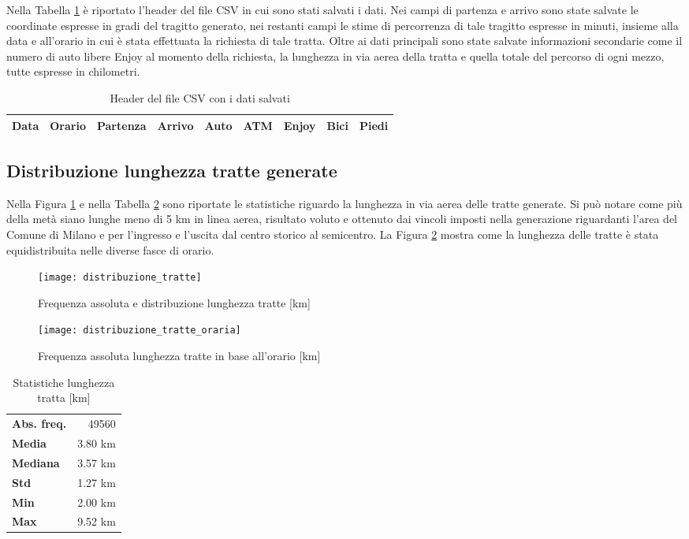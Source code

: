 Nella Tabella \ref{table:7} è riportato l'header del file CSV in cui sono stati salvati i dati. Nei campi di partenza e arrivo sono state salvate le coordinate espresse in gradi del tragitto generato, nei restanti campi le stime di percorrenza di tale tragitto espresse in minuti, insieme alla data e all'orario in cui è stata effettuata la richiesta di tale tratta. Oltre ai dati principali sono state salvate informazioni secondarie come il numero di auto libere Enjoy al momento della richiesta, la lunghezza in via aerea della tratta e quella totale del percorso di ogni mezzo, tutte espresse in chilometri.

\begin{table}[H]
	\centering
	\begin{tabular}{ | c | c | c | c | c | c | c | c | c | }
		\hline
		Data & Orario & Partenza & Arrivo & Auto & ATM & Enjoy & Bici & Piedi \\
		\hline
	\end{tabular}
	\caption{Header del file CSV con i dati salvati}
	\label{table:7}
\end{table}

\subsection{Distribuzione lunghezza tratte generate}

Nella Figura \ref{image:2} e nella Tabella \ref{table:2} sono riportate le statistiche riguardo la lunghezza in via aerea delle tratte generate. Si può notare come più della metà siano lunghe meno di 5 km in linea aerea, risultato voluto e ottenuto dai vincoli imposti nella generazione riguardanti l'area del Comune di Milano e per l'ingresso e l'uscita dal centro storico al semicentro. La Figura \ref{image:19} mostra come la lunghezza delle tratte è stata equidistribuita nelle diverse fasce di orario.

\begin{figure}[H]
	\centering
	\texttt{[image: distribuzione\_tratte]}
	\caption{Frequenza assoluta e distribuzione lunghezza tratte [km]}
	\label{image:2}
\end{figure}

\begin{figure}[H]
	\centering
	\texttt{[image: distribuzione\_tratte\_oraria]}
	\caption{Frequenza assoluta lunghezza tratte in base all'orario [km]}
	\label{image:19}
\end{figure}

\begin{table}[H]
	\centering
	\begin{tabular}{ | l r | }
		\hline
		\textbf{Abs. freq.} & 49560 \\
		\textbf{Media} & 3.80 km \\
		\textbf{Mediana} & 3.57 km \\
		\textbf{Std} & 1.27 km \\
		\textbf{Min} & 2.00 km \\
		\textbf{Max} & 9.52 km \\
		\hline
	\end{tabular}
	\caption{Statistiche lunghezza tratta [km]}
	\label{table:2}
\end{table}


